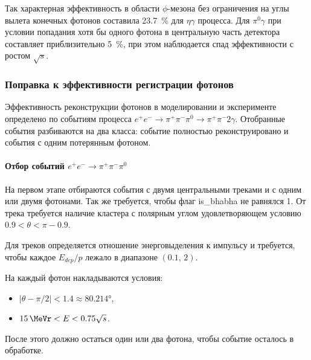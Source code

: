 Так характерная эффективность в области $\phi$-мезона без ограничения на углы вылета конечных
фотонов составила \SI{23.7}{\percent} для $\eta \gamma$ процесса.
Для $\pi^0 \gamma$ при условии попадания хотя бы одного фотона в центральную часть детектора
составляет приблизительно \SI{5}{\percent},
при этом наблюдается спад эффективности с ростом $\sqrt{s}$.



\subsubsection{Поправка к эффективности регистрации фотонов}



Эффективность реконструкции фотонов в моделировании и эксперименте определено по событиям процесса
$e^+ e^- \to \pi^+ \pi^- \pi^0 \to \pi^+ \pi^- 2 \gamma$.
Отобранные события разбиваются на два класса:
событие полностью реконструировано и
события с одним потерянным фотоном.


\paragraph{Отбор событий $e^+ e^- \to \pi^+ \pi^- \pi^0$}

На первом этапе отбираются события с двумя центральными треками и с одним или двумя фотонами.
Так же требуется, чтобы флаг is\_bhabha не равнялся 1.
От трека требуется наличие кластера с полярным углом удовлетворяющем условию $0.9 < \theta < \pi - 0.9$.

Для треков определяется отношение энерговыделения к импульсу и
требуется,
чтобы каждое $E_{dep} / p$ лежало в диапазоне $(0.1, \, 2)$.

На каждый фотон накладываются условия:
\begin{itemize}
    \item $| \theta - \pi/2| < 1.4 \approx \ang{80.214}$,
    \item $\SI{15}{\MeVr} < E < 0.75 \sqrt{s}$.
\end{itemize}
После этого должно остаться один или два фотона, чтобы событие осталось в обработке.

